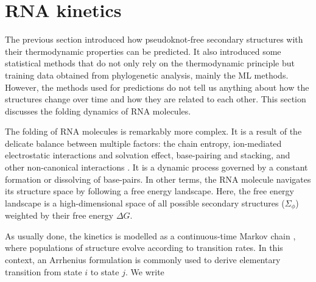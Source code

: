 \section{RNA kinetics} %
The previous section introduced how pseudoknot-free secondary structures with their thermodynamic properties can be predicted. It also introduced some statistical methods that do not only rely on the thermodynamic principle but training data obtained from phylogenetic analysis, mainly the \ac{ML} methods. However, the methods used for predictions do not tell us anything about how the structures change over time and how they are related to each other. This section discusses the folding dynamics of \ac{RNA} molecules. 

The folding of \ac{RNA} molecules is remarkably more complex. It is a result of the delicate balance between multiple factors: the chain entropy, ion-mediated electrostatic interactions and solvation effect, base-pairing and stacking, and other non-canonical interactions \cite{chen2008rna}. It is a dynamic process governed by a constant formation or dissolving of base-pairs. In other terms, the \ac{RNA} molecule navigates its structure space by following a free energy landscape. Here, the free energy landscape is a high-dimensional space of all possible secondary structures ($\Sigma_{\phi}$) weighted by their free energy $\Delta G$.  


As usually done, the kinetics is modelled as a continuous-time Markov chain \cite{lorenz20_effic_comput_base_probab_multi_rna_foldin}, where populations of structure evolve according to transition rates. In this context, an Arrhenius formulation is commonly used to derive elementary transition from state $i$ to state $j$. We write 


